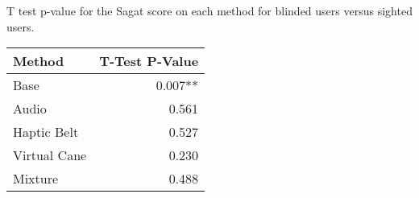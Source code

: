 
\centering
\caption{T test p-value for the Sagat score on each method for blinded users versus sighted users.}
\label{tab:ttest_sagat_score}
\begin{tabular}{lr}
\toprule
      Method & T-Test P-Value \\
\midrule
        Base &        0.007** \\
       Audio &          0.561 \\
 Haptic Belt &          0.527 \\
Virtual Cane &          0.230 \\
     Mixture &          0.488 \\
\bottomrule
\end{tabular}
